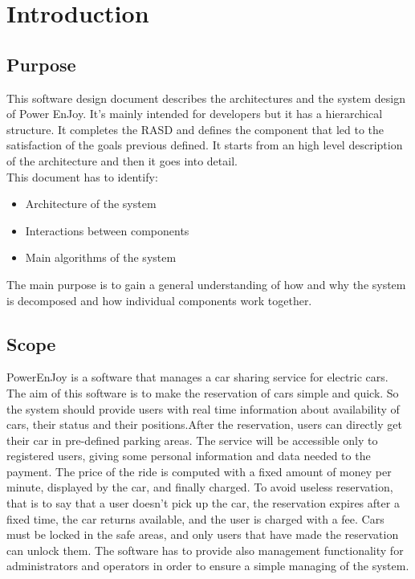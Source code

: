 
\section{Introduction}

\subsection{Purpose}

This software design document describes the architectures and the
system design of Power EnJoy. It's mainly intended for developers
but it has a hierarchical structure. It completes the RASD and defines
the component that led to the satisfaction of the goals previous defined.
It starts from an high level description of the architecture and then
it goes into detail. \\
This document has to identify:
\begin{itemize}
\item Architecture of the system
\item Interactions between components
\item Main algorithms of the system
\end{itemize}
The main purpose is to gain a general understanding of how and why
the system is decomposed and how individual components work together. 

\subsection{Scope}

PowerEnJoy is a software that manages a car sharing service for electric
cars. The aim of this software is to make the reservation of cars
simple and quick. So the system should provide users with real time
information about availability of cars, their status and their positions.After
the reservation, users can directly get their car in pre-defined parking
areas. The service will be accessible only to registered users, giving
some personal information and data needed to the payment. The price
of the ride is computed with a fixed amount of money per minute, displayed
by the car, and finally charged. To avoid useless reservation, that
is to say that a user doesn\textquoteright t pick up the car, the
reservation expires after a fixed time, the car returns available,
and the user is charged with a fee. Cars must be locked in the safe
areas, and only users that have made the reservation can unlock them.
The software has to provide also management functionality for administrators
and operators in order to ensure a simple managing of the system. 

